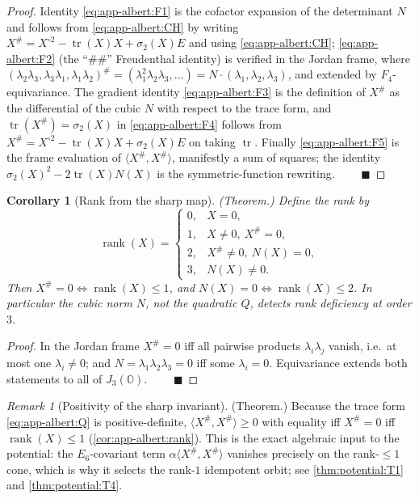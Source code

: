 \documentclass[11pt]{article}
\theoremstyle{plain}
\newtheorem{corollary}[theorem]{Corollary}
\theoremstyle{definition}
\theoremstyle{remark}
\newtheorem{remark}[theorem]{Remark}
\begin{document}
\begin{proof}
Identity \eqref{eq:app-albert:F1} is the cofactor expansion of the determinant
$N$ and follows from \eqref{eq:app-albert:CH} by writing
$X^\#=X^{\circ2}-\operatorname{tr}(X)X+\sigma_2(X)E$ and using
\eqref{eq:app-albert:CH}; \eqref{eq:app-albert:F2} (the ``$\#\#$'' Freudenthal
identity) is verified in the Jordan frame, where
$(\lambda_2\lambda_3,\lambda_3\lambda_1,\lambda_1\lambda_2)^\#
=(\lambda_1^2\lambda_2\lambda_3,\dots)=N\cdot(\lambda_1,\lambda_2,\lambda_3)$, and
extended by $F_4$-equivariance. The gradient identity \eqref{eq:app-albert:F3} is
the definition of $X^\#$ as the differential of the cubic $N$ with respect to the
trace form, and $\operatorname{tr}(X^\#)=\sigma_2(X)$ in
\eqref{eq:app-albert:F4} follows from
$X^\#=X^{\circ2}-\operatorname{tr}(X)X+\sigma_2(X)E$ on taking $\operatorname{tr}$.
Finally \eqref{eq:app-albert:F5} is the frame evaluation of
$\langle X^\#,X^\#\rangle$, manifestly a sum of squares; the identity
$\sigma_2(X)^2-2\operatorname{tr}(X)N(X)$ is the symmetric-function rewriting.
$\qquad\blacksquare$
\end{proof}

\begin{corollary}[Rank from the sharp map]\label{cor:app-albert:rank}
\textup{(Theorem.)}
Define the \emph{rank} by
\begin{equation}\label{eq:app-albert:rank}
  \operatorname{rank}(X)=
  \begin{cases}
    0,& X=0,\\
    1,& X\neq 0,\ X^\#=0,\\
    2,& X^\#\neq0,\ N(X)=0,\\
    3,& N(X)\neq0.
  \end{cases}
\end{equation}
Then $X^\#=0\iff\operatorname{rank}(X)\le1$, and $N(X)=0\iff\operatorname{rank}(X)
\le2$. In particular the cubic norm $N$, not the quadratic $Q$, detects rank
deficiency at order $3$.
\end{corollary}

\begin{proof}
In the Jordan frame $X^\#=0$ iff all pairwise products $\lambda_i\lambda_j$
vanish, i.e.\ at most one $\lambda_i\neq0$; and $N=\lambda_1\lambda_2\lambda_3=0$
iff some $\lambda_i=0$. Equivariance extends both statements to all of
$J_3(\mathbb O)$. $\qquad\blacksquare$
\end{proof}

\begin{remark}[Positivity of the sharp invariant]\label{rmk:app-albert:positivity}
\textup{(Theorem.)}
Because the trace form \eqref{eq:app-albert:Q} is positive-definite,
$\langle X^\#,X^\#\rangle\ge0$ with equality iff $X^\#=0$ iff
$\operatorname{rank}(X)\le1$ (\autoref{cor:app-albert:rank}). This is the exact
algebraic input to the potential: the $E_6$-covariant term
$\alpha\langle X^\#,X^\#\rangle$ vanishes precisely on the rank-$\le1$ cone, which
is why it selects the rank-$1$ idempotent orbit; see
\autoref{thm:potential:T1} and \autoref{thm:potential:T4}.
\end{remark}
\end{document}
